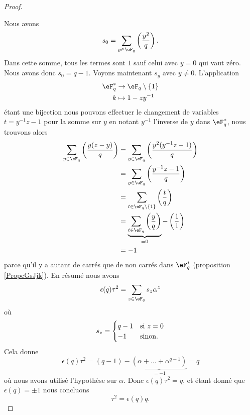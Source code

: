\begin{proof}
\begin{itemize}
    \end{itemize}
    Nous avons 
    \begin{equation}
        s_0=\sum_{y\in \eF_q}\left(\frac{y^2}{q}\right).
    \end{equation}
    Dans cette somme, tous les termes sont \( 1\) sauf celui avec \( y=0\) qui vaut zéro. Nous avons donc \( s_0=q-1\). Voyons maintenant \( s_y\) avec \( y\neq 0\). L'application
    \begin{equation}
        \begin{aligned}
            \eF^*_q&\to \eF_q\setminus\{ 1 \} \\
            k&\mapsto 1-zy^{-1} 
        \end{aligned}
    \end{equation}
    étant une bijection nous pouvons effectuer le changement de variables \( t=y^{-1}z-1\) pour la somme sur \( y\) en notant \( y^{-1}\) l'inverse de \( y\) dans \( \eF^*_q\), nous trouvons alors
    \begin{subequations}
        \begin{align}
            \sum_{y\in \eF_q}\left(\frac{y(z-y)}{q}\right)&=\sum_{y\in \eF_q}\left(\frac{y^2(y^{-1}z-1)}{q}\right)\\
            &=\sum_{y\in \eF_q}\left(\frac{y^{-1}z-1}{q}\right)\\
            &=\sum_{t\in \eF_q\setminus\{ 1 \}}\left(\frac{t}{q}\right)\\
            &=\underbrace{\sum_{t\in \eF_q}\left(\frac{y}{q}\right)}_{=0}-\left(\frac{1}{1}\right)\\
            &=-1
        \end{align}
    \end{subequations}
    parce qu'il  y a autant de carrés que de non carrés dans \( \eF_q^*\) (proposition \ref{PropcGsJjk}). En résumé nous avons
    \begin{equation}
        \epsilon(q)\tau^2=\sum_{z\in \eF_q}s_z\alpha^z
    \end{equation}
    où
    \begin{equation}
        s_z=\begin{cases}
            q-1    &   \text{si \( z=0\)}\\
            -1    &    \text{sinon}.
        \end{cases}
    \end{equation}
    Cela donne
    \begin{equation}
        \epsilon(q)\tau^2=(q-1)-\underbrace{(\alpha+\ldots +\alpha^{q-1})}_{=-1}=q
    \end{equation}
    où nous avons utilisé l'hypothèse sur \( \alpha\). Donc \( \epsilon(q)\tau^2=q\), et étant donné que \( \epsilon(q)=\pm 1\) nous concluons
    \begin{equation}
        \tau^2=\epsilon(q)q.
    \end{equation}
    

\end{proof}
